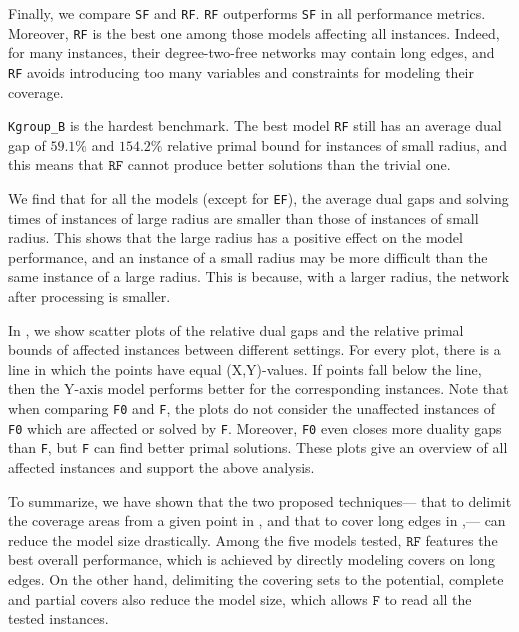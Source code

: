 Finally, we compare  \texttt{SF} and \texttt{RF}. \texttt{RF} outperforms \texttt{SF} in all performance metrics. Moreover,  \texttt{RF} is the best one among those models affecting all instances. Indeed, for many instances, their degree-two-free networks may contain long edges, and \texttt{RF} avoids introducing too many variables and constraints for modeling their coverage.

\texttt{Kgroup\_B} is the hardest benchmark. The best model \texttt{RF} still has  an average dual gap of $59.1\%$ and $154.2\%$ relative primal bound for instances of small radius, and this means that $\texttt{RF}$ cannot produce better solutions than the trivial one.

We find that for all the models (except for \texttt{EF}), the average dual gaps and solving times of instances of large radius are smaller than those of instances of small radius. This shows that the large radius has a positive effect on the model performance, and an instance of a small radius may be more difficult than the same instance of a large radius. This is because, with a larger radius, the network after processing is smaller.

In , we show scatter plots of the relative dual gaps and the relative primal bounds  of affected instances between different settings. For every plot, there is a line in which the points have equal (X,Y)-values. If points fall below the line, then the Y-axis model performs better for the corresponding instances. Note that when comparing  \texttt{F0} and  \texttt{F}, the plots do not consider the unaffected instances of \texttt{F0} which are affected or solved by \texttt{F}. Moreover, \texttt{F0} even closes more duality gaps than \texttt{F}, but \texttt{F} can find better primal solutions. These plots give an overview of all affected instances and support the above analysis.

To summarize, we have shown that the two proposed techniques---  that to delimit the coverage  areas from a given point in , and that to cover long edges in ,--- can reduce the model size drastically. Among the five models tested, $\texttt{RF}$ features the best overall performance, which is achieved by directly modeling covers on long edges. On the other hand, delimiting the covering sets to the potential, complete and partial covers also reduce the model size, which allows $\texttt{F}$ to read all the tested instances.





